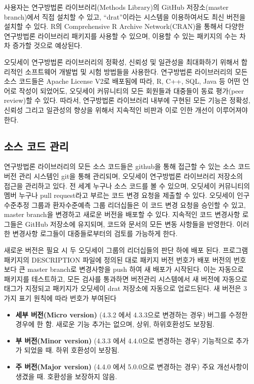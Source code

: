 \documentclass[11pt]{book}
\providecommand{\tightlist}{%
  \setlength{\itemsep}{0pt}\setlength{\parskip}{0pt}}
\theoremstyle{definition}
\theoremstyle{definition}
\theoremstyle{definition}
\theoremstyle{remark}
\begin{document}
사용자는 연구방법론 라이브러리(Methods Library)의 GitHub 저장소(master
branch)에서 직접 설치할 수 있고, ``drat''이라는 시스템을 이용하여서도
최신 버전을 설치할 수 있다. R의 Comprehensive R Archive Network(CRAN)을
통해서 다양한 연구방법론 라이브러리 패키지를 사용할 수 있으며, 이용할 수
있는 패키지의 수는 차차 증가할 것으로 예상된다.

오딧세이 연구방법론 라이브러리의 정확성, 신뢰성 및 일관성을 최대화하기
위해서 합리적인 소프트웨어 개발법 및 시험 방법들을 사용한다. 연구방법론
라이브러리의 모든 소스 코드들은 Apache License V2로 배포됨에 따라, R,
C++, SQL, Java 등 어떤 언어로 작성이 되었어도, 오딧세이 커뮤니티의 모든
회원들과 대중들이 동료 평가(peer review)할 수 있다. 따라서, 연구방법론
라이브러리 내부에 구현된 모든 기능은 정확성, 신뢰성 그리고 일관성의
향상을 위해서 지속적인 비판과 이로 인한 개선이 이루어져야 한다.

\subsection{소스 코드 관리}\label{--}

연구방법론 라이브러리의 모든 소스 코드들은 github을 통해 접근할 수 있는
소스 코드 버전 관리 시스템인 git을 통해 관리되며, 오딧세이 연구방법론
라이브러리 저장소의 접근을 관리하고 있다. 전 세계 누구나 소스 코드를 볼
수 있으며, 오딧세이 커뮤니티의 멤버 누구나 pull request라고 부르는 코드
변경 요청을 제출할 수 있다. 오딧세이 인구수준추정 그룹과 환자수준예측
그룹 리더십들은 이 코드 변경 요청을 승인할 수 있고, master branch을
변경하고 새로운 버전을 배포할 수 있다. 지속적인 코드 변경사항 로그들은
GitHub 저장소에 유지되며, 코드와 문서의 모든 변동 사항들을 반영한다.
이러한 변경사항 로그들이 대중들로부터의 검토를 가능하게 한다.

새로운 버전은 필요 시 두 오딧세이 그룹의 리더십들의 판단 하에 배포 된다.
프로그램 패키지의 DESCRIPTION 파일에 정의된 대로 패키지 버전 번호가 배포
버전의 번호보다 큰 master branch로 변경사항을 push 하여 새 배포가
시작된다. 이는 자동으로 패키지를 테스트하고, 모든 검사를 통과하면
버전관리 시스템에서 새 버전에 자동으로 태그가 지정되고 패키지가 오딧세이
drat 저장소에 자동으로 업로드된다. 새 버전은 3가지 표기 원칙에 따라
번호가 부여된다

\begin{itemize}
\tightlist
\item
  \textbf{세부 버전(Micro version)} (4.3.2 에서 4.3.3으로 변경하는 경우)
  버그를 수정한 경우에 한 함. 새로운 기능 추가는 없으며, 상위,
  하위호환성도 보장됨.
\item
  \textbf{부 버전(Minor version)} (4.3.3 에서 4.4.0으로 변경하는 경우)
  기능적으로 추가가 되었을 때. 하위 호환성이 보장됨.
\item
  \textbf{주 버전(Major version)} (4.4.0 에서 5.0.0으로 변경하는 경우)
  주요 개선사항이 생겼을 때. 호환성을 보장하지 않음.
\end{itemize}
\end{document}
